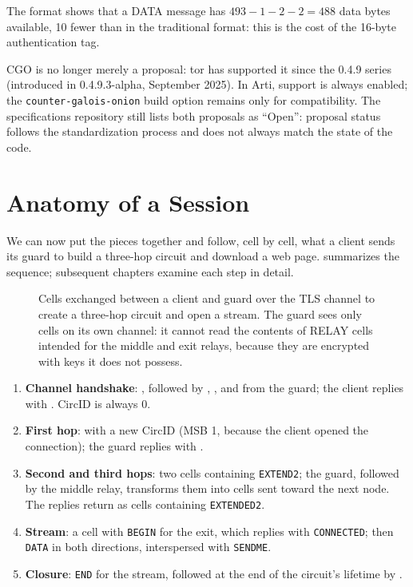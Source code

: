 \begin{approfondimento}
The format shows that a DATA message has $493 - 1 - 2 - 2 = 488$ data bytes available, 10 fewer than in the traditional format: this is the cost of the 16-byte authentication tag.
\end{approfondimento}

CGO is no longer merely a proposal: tor has supported it since the 0.4.9 series (introduced in 0.4.9.3-alpha, September 2025). In Arti, support is always enabled; the \texttt{counter-galois-onion} build option remains only for compatibility. The specifications repository still lists both proposals as \enquote{Open}: proposal status follows the standardization process and does not always match the state of the code.

\section{Anatomy of a Session}\label{sec:sessione}

We can now put the pieces together and follow, cell by cell, what a client sends its guard to build a three-hop circuit and download a web page.  summarizes the sequence; subsequent chapters examine each step in detail.

\begin{figure}[htbp]
\centering

\caption{Cells exchanged between a client and guard over the TLS channel to create a three-hop circuit and open a stream. The guard sees only cells on its own channel: it cannot read the contents of RELAY cells intended for the middle and exit relays, because they are encrypted with keys it does not possess.}
\label{fig:sessione}
\end{figure}

\begin{enumerate}
  \item \textbf{Channel handshake}: , followed by , , and  from the guard; the client replies with . CircID is always 0.
  \item \textbf{First hop}:  with a new CircID (MSB 1, because the client opened the connection); the guard replies with .
  \item \textbf{Second and third hops}: two  cells containing \texttt{EXTEND2}; the guard, followed by the middle relay, transforms them into  cells sent toward the next node. The replies return as  cells containing \texttt{EXTENDED2}.
  \item \textbf{Stream}: a cell with \texttt{BEGIN} for the exit, which replies with \texttt{CONNECTED}; then \texttt{DATA} in both directions, interspersed with \texttt{SENDME}.
  \item \textbf{Closure}: \texttt{END} for the stream, followed at the end of the circuit's lifetime by .
\end{enumerate}

